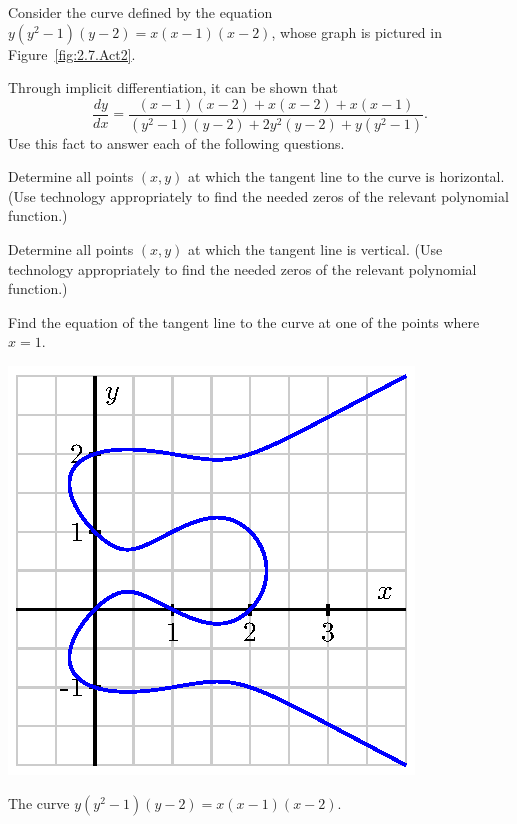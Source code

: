 \begin{activity} \label{A:2.7.2}  
Consider the curve defined by the equation $y(y^2-1)(y-2) = x(x-1)(x-2)$, whose graph is pictured in Figure~\ref{fig:2.7.Act2}.

Through implicit differentiation, it can be shown that
$$\frac{dy}{dx} = \frac{(x-1)(x-2) + x(x-2) + x(x-1)}{(y^2-1)(y-2) + 2y^2(y-2) + y(y^2-1)}.$$
Use this fact to answer each of the following questions.
\ba
	\item Determine all points $(x,y)$ at which the tangent line to the curve is horizontal.  (Use technology appropriately to find the needed zeros of the relevant polynomial function.)
	\item Determine all points $(x,y)$ at which the tangent line is vertical.  (Use technology appropriately to find the needed zeros of the relevant polynomial function.)
	\item Find the equation of the tangent line to the curve at one of the points where $x = 1$.  
\ea
\end{activity}

\begin{marginfigure}[-5cm]
\includegraphics{figures/2_7_Act2.eps}
\caption{The curve $y(y^2-1)(y-2) = x(x-1)(x-2)$.} \label{fig:2.7.Act2}
\end{marginfigure}


